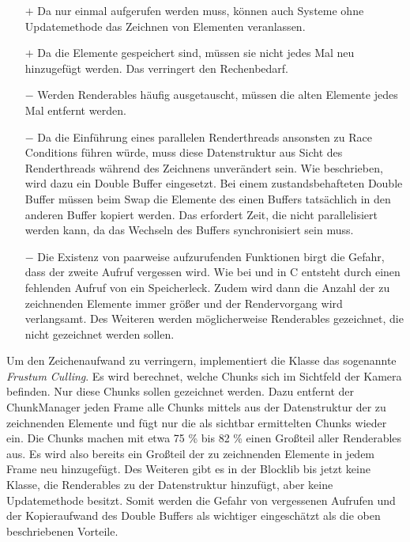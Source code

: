 \begin{itemize}
	\item[$+$] Da  nur einmal aufgerufen werden muss, können auch Systeme ohne Updatemethode das Zeichnen von Elementen veranlassen.
	\item[$+$] Da die Elemente gespeichert sind, müssen sie nicht jedes Mal neu hinzugefügt werden. Das verringert den Rechenbedarf.
	\item[$-$] Werden Renderables häufig ausgetauscht, müssen die alten Elemente jedes Mal entfernt werden.
	\item[$-$] Da die Einführung eines parallelen Renderthreads ansonsten zu Race Conditions führen würde, muss diese Datenstruktur aus Sicht des Renderthreads während des Zeichnens unverändert sein. Wie beschrieben, wird dazu ein Double Buffer eingesetzt. Bei einem zustandsbehafteten Double Buffer müssen beim Swap die Elemente des einen Buffers tatsächlich in den anderen Buffer kopiert werden. Das erfordert Zeit, die nicht parallelisiert werden kann, da das Wechseln des Buffers synchronisiert sein muss.
	\item[$-$] Die Existenz von paarweise aufzurufenden Funktionen birgt die Gefahr, dass der zweite Aufruf vergessen wird. Wie bei  und  in C entsteht durch einen fehlenden Aufruf von  ein Speicherleck. Zudem wird dann die Anzahl der zu zeichnenden Elemente immer größer und der Rendervorgang wird verlangsamt. Des Weiteren werden möglicherweise Renderables gezeichnet, die nicht gezeichnet werden sollen.
\end{itemize}

Um den Zeichenaufwand zu verringern, implementiert die Klasse  das sogenannte \emph{Frustum Culling}. Es wird berechnet, welche Chunks sich im Sichtfeld der Kamera befinden. Nur diese Chunks sollen gezeichnet werden. Dazu entfernt der ChunkManager jeden Frame alle Chunks mittels  aus der Datenstruktur der zu zeichnenden Elemente und fügt nur die als sichtbar ermittelten Chunks wieder ein. Die Chunks machen mit etwa 
75 \% bis
82 \% einen Großteil aller Renderables aus. Es wird also bereits ein Großteil der zu zeichnenden Elemente in jedem Frame neu hinzugefügt. Des Weiteren gibt es in der Blocklib bis jetzt keine Klasse, die Renderables zu der Datenstruktur hinzufügt, aber keine Updatemethode besitzt. Somit werden die Gefahr von vergessenen  Aufrufen und der Kopieraufwand des Double Buffers als wichtiger eingeschätzt als die oben beschriebenen Vorteile.

